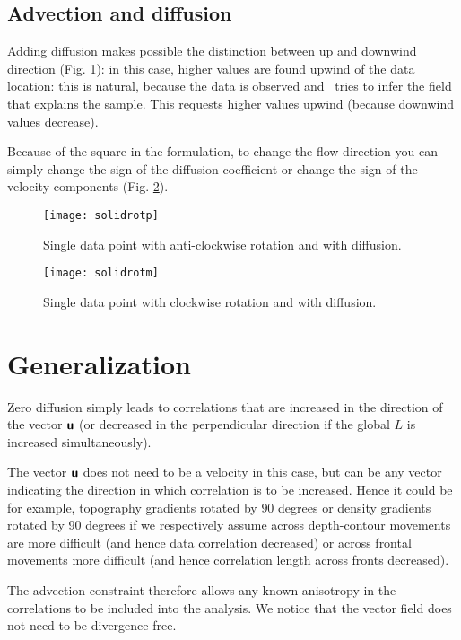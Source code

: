 \subsection{Advection and diffusion}

Adding diffusion makes possible the distinction between up and downwind 
direction (Fig. \ref{fig:solidrotp}): in this case, higher values are found upwind of the data 
location: this is natural, because the data is observed and \diva\, tries to 
infer the field that explains the sample. This requests higher values 
upwind (because downwind values decrease).

Because of the square in the formulation, to change the flow direction 
you can simply change the sign of the diffusion coefficient or change 
the sign of the velocity components (Fig. \ref{fig:solidrotm}).

\begin{figure}[htpb]
\parbox{.6\textwidth}{
\texttt{[image: solidrotp]}
}\parbox{.4\textwidth}{
\caption{Single data point with anti-clockwise rotation and with diffusion. \label{fig:solidrotp}}
}
\end{figure}

\begin{figure}[htpb]
\centering
\parbox{.6\textwidth}{
\texttt{[image: solidrotm]}
}\parbox{.4\textwidth}{
\caption{Single data point with clockwise rotation and with diffusion. \label{fig:solidrotm}}
}
\end{figure}





\section{Generalization}

Zero diffusion simply leads to correlations that are increased in the 
direction of the vector $\mbox{\boldmath $ \protect\mathsf{u} $}$ (or decreased in the perpendicular 
direction if the global $L$ is increased simultaneously). 

The vector $\mbox{\boldmath $ \protect\mathsf{u} $}$ does not need to be a velocity in this case, but can be any 
vector indicating the direction in which correlation is to be increased.
Hence it could be for example, topography gradients rotated by $90$ degrees 
or density gradients rotated by 90 degrees if we respectively assume across depth-contour movements are more 
difficult (and hence data correlation decreased) or across frontal movements more difficult (and hence correlation length 
across fronts decreased).

The advection constraint therefore allows any known anisotropy in the correlations to be included into the analysis. We notice that the vector field does not need to be divergence free.




